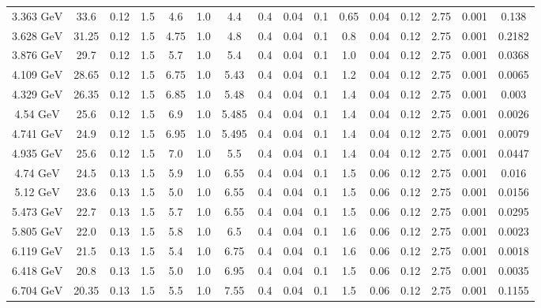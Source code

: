 \documentclass[11pt]{article}
\begin{document}
\begin{table}[htbp]
{\begin{tabular}{cccccccccccccccc}
				3.363 ${\textrm{GeV}}$ & 33.6 & 0.12 & 1.5 & 4.6 & 1.0 & 4.4 & 0.4 & 0.04 & 0.1 & 0.65 & 0.04 & 0.12 & 2.75 & 0.001 & 0.138 \\
				3.628 ${\textrm{GeV}}$ & 31.25 & 0.12 & 1.5 & 4.75 & 1.0 & 4.8 & 0.4 & 0.04 & 0.1 & 0.8 & 0.04 & 0.12 & 2.75 & 0.001 & 0.2182 \\
				3.876 ${\textrm{GeV}}$ & 29.7 & 0.12 & 1.5 & 5.7 & 1.0 & 5.4 & 0.4 & 0.04 & 0.1 & 1.0 & 0.04 & 0.12 & 2.75 & 0.001 & 0.0368 \\
				4.109 ${\textrm{GeV}}$ & 28.65 & 0.12 & 1.5 & 6.75 & 1.0 & 5.43 & 0.4 & 0.04 & 0.1 & 1.2 & 0.04 & 0.12 & 2.75 & 0.001 & 0.0065 \\
				4.329 ${\textrm{GeV}}$ & 26.35 & 0.12 & 1.5 & 6.85 & 1.0 & 5.48 & 0.4 & 0.04 & 0.1 & 1.4 & 0.04 & 0.12 & 2.75 & 0.001 & 0.003 \\
				4.54 ${\textrm{GeV}}$ & 25.6 & 0.12 & 1.5 & 6.9 & 1.0 & 5.485 & 0.4 & 0.04 & 0.1 & 1.4 & 0.04 & 0.12 & 2.75 & 0.001 & 0.0026 \\
				4.741 ${\textrm{GeV}}$ & 24.9 & 0.12 & 1.5 & 6.95 & 1.0 & 5.495 & 0.4 & 0.04 & 0.1 & 1.4 & 0.04 & 0.12 & 2.75 & 0.001 & 0.0079 \\
				4.935 ${\textrm{GeV}}$ & 25.6 & 0.12 & 1.5 & 7.0 & 1.0 & 5.5 & 0.4 & 0.04 & 0.1 & 1.4 & 0.04 & 0.12 & 2.75 & 0.001 & 0.0447 \\
				\midrule
				4.74 ${\textrm{GeV}}$ & 24.5 & 0.13 & 1.5 & 5.9 & 1.0 & 6.55 & 0.4 & 0.04 & 0.1 & 1.5 & 0.06 & 0.12 & 2.75 & 0.001 & 0.016 \\
				5.12 ${\textrm{GeV}}$ & 23.6 & 0.13 & 1.5 & 5.0 & 1.0 & 6.55 & 0.4 & 0.04 & 0.1 & 1.5 & 0.06 & 0.12 & 2.75 & 0.001 & 0.0156 \\
				5.473 ${\textrm{GeV}}$ & 22.7 & 0.13 & 1.5 & 5.7 & 1.0 & 6.55 & 0.4 & 0.04 & 0.1 & 1.5 & 0.06 & 0.12 & 2.75 & 0.001 & 0.0295 \\
				5.805 ${\textrm{GeV}}$ & 22.0 & 0.13 & 1.5 & 5.8 & 1.0 & 6.5 & 0.4 & 0.04 & 0.1 & 1.6 & 0.06 & 0.12 & 2.75 & 0.001 & 0.0023 \\
				6.119 ${\textrm{GeV}}$ & 21.5 & 0.13 & 1.5 & 5.4 & 1.0 & 6.75 & 0.4 & 0.04 & 0.1 & 1.6 & 0.06 & 0.12 & 2.75 & 0.001 & 0.0018 \\
				6.418 ${\textrm{GeV}}$ & 20.8 & 0.13 & 1.5 & 5.0 & 1.0 & 6.95 & 0.4 & 0.04 & 0.1 & 1.5 & 0.06 & 0.12 & 2.75 & 0.001 & 0.0035 \\
				6.704 ${\textrm{GeV}}$ & 20.35 & 0.13 & 1.5 & 5.5 & 1.0 & 7.55 & 0.4 & 0.04 & 0.1 & 1.5 & 0.06 & 0.12 & 2.75 & 0.001 & 0.1155 \\
				\midrule

\end{tabular}}
\end{table}
\end{document}
